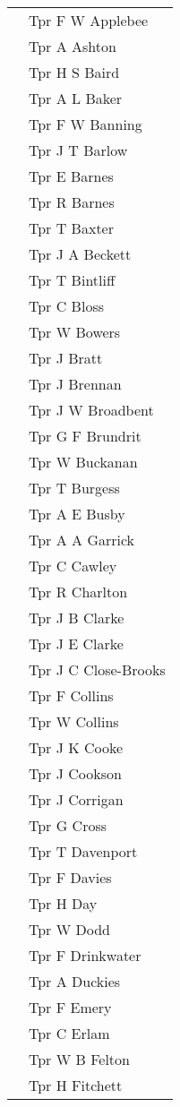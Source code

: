 \begin{center}
\begin{tabular}{rl}
    & Tpr F W Applebee \\
    & Tpr A Ashton \\
    & Tpr H S Baird \\
    & Tpr A L Baker \\
    & Tpr F W Banning \\
    & Tpr J T Barlow \\
    & Tpr E Barnes \\
    & Tpr R Barnes \\
    & Tpr T Baxter \\
    & Tpr J A Beckett \\
    & Tpr T Bintliff \\
    & Tpr C Bloss \\
    & Tpr W Bowers \\
    & Tpr J Bratt \\
    & Tpr J Brennan \\
    & Tpr J W Broadbent \\
    & Tpr G F Brundrit \\
    & Tpr W Buckanan \\
    & Tpr T Burgess \\
    & Tpr A E Busby \\
    & Tpr A A Garrick \\
    & Tpr C Cawley \\
    & Tpr R Charlton \\
    & Tpr J B Clarke \\
    & Tpr J E Clarke \\
    & Tpr J C Close-Brooks \\
    & Tpr F Collins \\
    & Tpr W Collins \\
    & Tpr J K Cooke \\
    & Tpr J Cookson \\
    & Tpr J Corrigan \\
    & Tpr G Cross \\
    & Tpr T Davenport \\
    & Tpr F Davies \\
    & Tpr H Day \\
    & Tpr W Dodd \\
    & Tpr F Drinkwater \\
    & Tpr A Duckies \\
    & Tpr F Emery \\
    & Tpr C Erlam \\
    & Tpr W B Felton \\
    & Tpr H Fitchett \\

\end{tabular}
\end{center}
